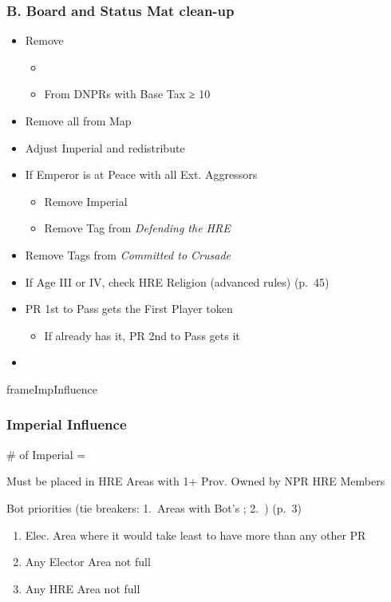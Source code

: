 \documentclass[10pt]{article}
\newlength{\fhImpInfluence} \setlength\fhImpInfluence{10\baselineskip}
\begin{document}
\subsubsection*{B. Board and Status Mat clean-up}
\begin{itemize}
	\item Remove \alliances
	\begin{itemize}
		\item {}
		\item From DNPRs with Base Tax ≥ 10\ducats
	\end{itemize}
	\item Remove all \plague from Map
	\item {}Adjust Imperial \influence and redistribute
	\item If Emperor is at Peace with all Ext. Aggressors
	\begin{itemize}
		\item Remove Imperial \manpower
		\item Remove Tag from \emph{Defending the HRE}
	\end{itemize}
	\item Remove Tags from \emph{Committed to Crusade}
	\item {}If Age III or IV, check HRE Religion (advanced rules) (p.~45)
	\item PR 1st to Pass gets the First Player token
	\begin{itemize}
		\item If already has it, PR 2nd to Pass gets it
	\end{itemize}
	\item {}
\end{itemize}
\begin{dynamiccontents*}{frameImpInfluence}\begin{eubox}{\fhImpInfluence}
	\subsubsection*{Imperial Influence }
	\begin{itemize}
		\item \# of Imperial \influence = \authority
		\item Must be placed in HRE Areas with 1+ Prov. Owned by NPR HRE Members
		{\botrules
		\item Bot priorities (tie breakers: 1. Areas with Bot's \allies; 2. \az) (p.~3)
		\begin{enumerate}
			\item Elec. Area where it would take least \influence to have more \influence than any other PR
			\item Any Elector Area not full
			\item Any HRE Area not full
		\end{enumerate}
		}
	\end{itemize}
\end{eubox}\end{dynamiccontents*}
\end{document}
